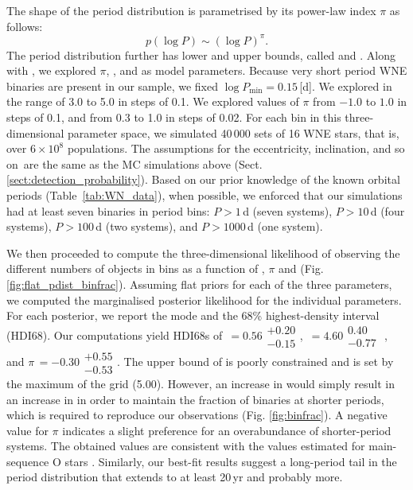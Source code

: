 The shape of the period distribution is parametrised by its power-law index $\pi$ as follows:
\begin{equation}
    p(\log P) \sim (\log P)^\pi. \label{eq:pdist_powerlaw}
\end{equation}
The period distribution further has lower and upper bounds, called \logPmin{} and \logPmax{}. Along with \fintWNE{}, we explored $\pi$, \logPmin{} , and \logPmax{} as model parameters. Because very short period WNE binaries are present in our sample, we fixed $\log P_\mathrm{min} = 0.15 $\,[d]. We explored \logPmax{} in the range  of 3.0 to 5.0 in steps of 0.1. We explored values of $\pi$ from $-1.0$ to $1.0$ in steps of 0.1, and \fintWNE{} from 0.3 to 1.0 in steps of 0.02. For each bin in this three-dimensional parameter space, we simulated 40\,000 sets of 16 WNE stars, that is, over  $6\times 10^8$ populations. The assumptions for the eccentricity, inclination, and so on\, are the same as the MC simulations above (Sect. \ref{sect:detection_probability}). Based on our prior knowledge of the known orbital periods (Table~\ref{tab:WN_data}), when possible, we enforced that our simulations had at least seven binaries in period bins: $P > 1$\,d (seven systems), $P > 10$\,d (four systems), $P > 100$\,d (two systems), and $P >1000$\,d (one system).

We then proceeded to compute the three-dimensional likelihood of observing the different numbers of objects in \DelRV{} bins as a function of \logPmax{}, $\pi$ and \fintWNE{} (Fig. \ref{fig:flat_pdist_binfrac}). Assuming flat priors for each of the three parameters, we computed the marginalised posterior likelihood for the individual parameters.  For each posterior, we report the mode and the 68\% highest-density interval (HDI68). Our computations yield HDI68s of \fintWNE{}\,$= 0.56\substack{+0.20 \\ -0.15}$, \logPmax{}\,$= 4.60\substack{0.40 \\ -0.77}$ , and $\pi$\,$= -0.30\substack{+0.55 \\ -0.53}$. The upper bound of \logPmax{} is poorly constrained and is set by the maximum of the grid (5.00). However, an increase in \logPmax{} would simply result in an increase in \fintWNE{} in order to maintain the fraction of binaries at shorter periods, which is required to reproduce our observations (Fig. \ref{fig:binfrac}). A negative value for $\pi$ indicates a slight preference for an overabundance of shorter-period systems. The obtained values are consistent with the values estimated for main-sequence O stars \citep[$f_{\textrm{bin}}=0.69\,\pm\,0.09$, $\pi=-0.55\,\pm\,0.22$:][]{2012Sana}. Similarly, our best-fit results suggest a long-period tail in the period distribution that extends to at least 20\,yr and probably more.

